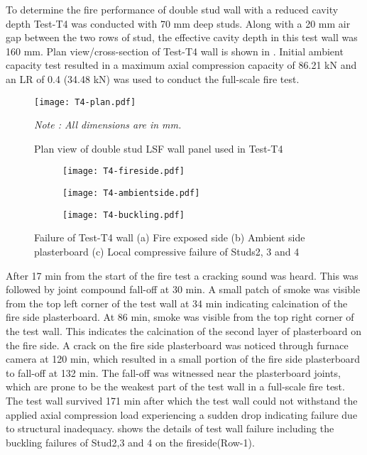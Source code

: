 To determine the fire performance of double stud wall with a reduced cavity depth Test-T4 was conducted with 70 mm deep studs. Along with a 20 mm air gap between the two rows of stud, the effective cavity depth in this test wall was 160 mm. Plan view/cross-section of Test-T4 wall is shown in . Initial ambient capacity test resulted in a maximum axial compression capacity of 86.21 kN and an LR of 0.4 (34.48 kN) was used to conduct the full-scale fire test.      
\begin{figure}[!htbp]
	\centering
	\texttt{[image: T4-plan.pdf]}
	\caption{Plan view of double stud LSF wall panel used in Test-T4}
	\label{fig:T4-plan}
	\fontsize{10}{1}\textit{Note : All dimensions are in mm.}
\end{figure}
\begin{figure}[!htbp]
	\centering
	\begin{subfigure}[b]{0.3\textwidth}
		\centering
		\texttt{[image: T4-fireside.pdf]}
		\caption{}
		\label{subfig:T4-fireside}
	\end{subfigure}
	\begin{subfigure}[b]{0.3\textwidth}
		\centering
		\texttt{[image: T4-ambientside.pdf]}
		\caption{}
		\label{subfig:T4-ambientside}
	\end{subfigure}
	\begin{subfigure}[b]{0.3\textwidth}
		\centering
		\texttt{[image: T4-buckling.pdf]}
		\caption{}
		\label{subfig:T4-buckling}
	\end{subfigure}
	   \caption{Failure of Test-T4 wall (a) Fire exposed side (b) Ambient side plasterboard (c) Local compressive failure of Studs2, 3 and 4}
	   \label{fig:T4-failure}
\end{figure}

After 17 min from the start of the fire test a cracking sound was heard. This was followed by joint compound fall-off at 30 min. A small patch of smoke was visible from the top left corner of the test wall at 34 min indicating calcination of the fire side plasterboard. At 86 min, smoke was visible from the top right corner of the test wall. This indicates the calcination of the second layer of plasterboard on the fire side. A crack on the fire side plasterboard was noticed through furnace camera at 120 min, which resulted in a small portion of the fire side plasterboard to fall-off at 132 min. The fall-off was witnessed near the plasterboard joints, which are prone to be the weakest part of the test wall in a full-scale fire test. The test wall survived 171 min after which the test wall could not withstand the applied axial compression load experiencing a sudden drop indicating failure due to structural inadequacy.  shows the details of test wall failure including the buckling failures of Stud2,3 and 4 on the fireside(Row-1).

